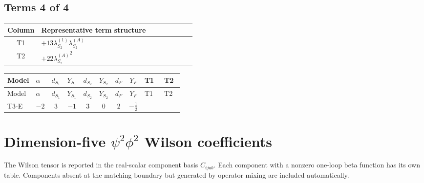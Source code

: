\documentclass[8pt]{article}
\begin{document}
\begin{landscape}
\subsection*{Terms 4 of 4}
\begin{center}
\begin{tabular}{@{}c >{\raggedright\arraybackslash}p{0.82\linewidth}@{}}
\toprule
Column & Representative term structure \\
\midrule
T1 & \(\displaystyle +13 {\lambda_{S_2}^{(1)}} {\lambda_{S_2}^{(A)}}\) \\
\midrule
T2 & \(\displaystyle +22 {\lambda_{S_2}^{(A)}}^2\) \\
\midrule
\bottomrule
\end{tabular}
\end{center}
\smallskip
\tiny
\begin{longtable}{@{}llcccccc >{\raggedright\arraybackslash}p{0.21\linewidth} >{\raggedright\arraybackslash}p{0.21\linewidth}@{}}
\toprule
Model & $\alpha$ & $d_{S_1}$ & $Y_{S_1}$ & $d_{S_2}$ & $Y_{S_2}$ & $d_F$ & $Y_F$ & T1 & T2 \\
\midrule
\endfirsthead
\toprule
Model & $\alpha$ & $d_{S_1}$ & $Y_{S_1}$ & $d_{S_2}$ & $Y_{S_2}$ & $d_F$ & $Y_F$ & T1 & T2 \\
\midrule
\endhead
T3-E & $-2$ & $3$ & $-1$ & $3$ & $0$ & $2$ & $-\frac{1}{2}$ & \scriptsize\adjustbox{max width=\linewidth}{$\begin{gathered} +13 {\lambda_{S_2}^{(1)}} {\lambda_{S_2}^{(A)}}\end{gathered}$} & \scriptsize\adjustbox{max width=\linewidth}{$\begin{gathered} +22 {\lambda_{S_2}^{(A)}}^2\end{gathered}$} \\
\midrule
\bottomrule
\end{longtable}
\clearpage
\section*{Dimension-five $\psi^2\phi^2$ Wilson coefficients}
The Wilson tensor is reported in the real-scalar component basis $C_{ijab}$. Each component with a nonzero one-loop beta function has its own table. Components absent at the matching boundary but generated by operator mixing are included automatically.

\end{landscape}
\end{document}
